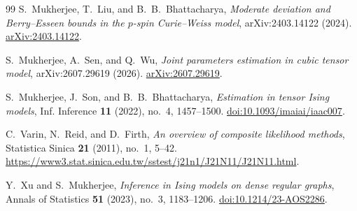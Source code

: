 \documentclass[11pt]{amsart}
\numberwithin{equation}{section}
\theoremstyle{remark}
\begin{document}
\begin{thebibliography}{99}
S.~Mukherjee, T.~Liu, and B.~B.~Bhattacharya,
\emph{Moderate deviation and Berry--Esseen bounds in the $p$-spin Curie--Weiss model},
arXiv:2403.14122 (2024).
\href{https://arxiv.org/abs/2403.14122}{arXiv:2403.14122}.

S.~Mukherjee, A.~Sen, and Q.~Wu,
\emph{Joint parameters estimation in cubic tensor model},
arXiv:2607.29619 (2026).
\href{https://arxiv.org/abs/2607.29619}{arXiv:2607.29619}.

S.~Mukherjee, J.~Son, and B.~B.~Bhattacharya,
\emph{Estimation in tensor Ising models},
Inf. Inference \textbf{11} (2022), no.~4, 1457--1500.
\href{https://doi.org/10.1093/imaiai/iaac007}{doi:10.1093/imaiai/iaac007}.

C.~Varin, N.~Reid, and D.~Firth,
\emph{An overview of composite likelihood methods},
Statistica Sinica \textbf{21} (2011), no.~1, 5--42.
\url{https://www3.stat.sinica.edu.tw/sstest/j21n1/J21N11/J21N11.html}.

Y.~Xu and S.~Mukherjee,
\emph{Inference in Ising models on dense regular graphs},
Annals of Statistics \textbf{51} (2023), no.~3, 1183--1206.
\href{https://doi.org/10.1214/23-AOS2286}{doi:10.1214/23-AOS2286}.

\end{thebibliography}
\end{document}
